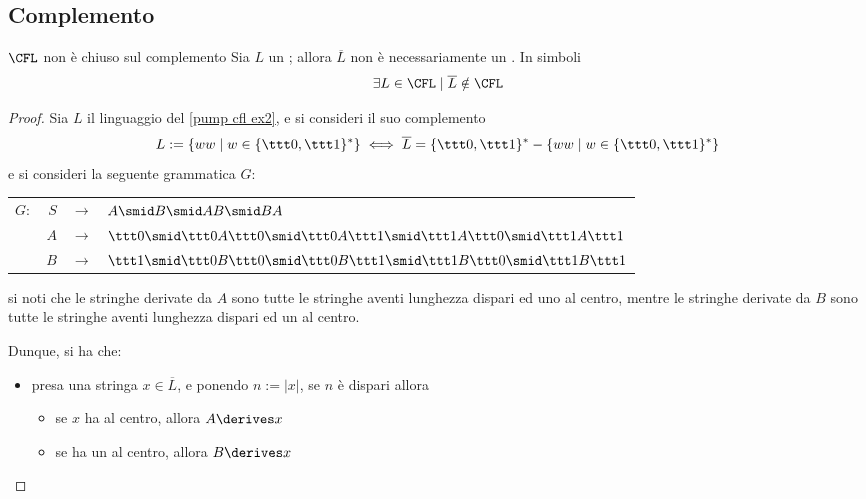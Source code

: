 \documentclass[a4paper, 12pt]{report}
\begin{document}
    \subsection{Complemento}

    \begin{framedprop}{$\mathrm{\CFL}$ non è chiuso sul complemento}
        Sia $L$ un \CFL; allora $\overline L$ non è necessariamente un \CFL. In simboli $$\exists L \in \CFL \mid \overline L \notin \CFL$$
    \end{framedprop}

    \begin{proof}
        Sia $L$ il linguaggio del \cref{pump cfl ex2}, e si consideri il suo complemento $$L := \{ww \mid w \in \{\ttt 0, \ttt 1\}^*\} \iff \overline L = \{\ttt 0, \ttt 1\}^* - \{ww \mid w \in \{\ttt 0, \ttt 1\}^*\}$$ e si consideri la seguente grammatica $G$:

        \begin{center}
            \begin{tabular}{crcl}
                $G:$ & $S$ & $\to$ & $A \smid B \smid AB \smid BA$ \\
                     & $A$ & $\to$ & $\ttt 0 \smid \ttt 0 A \ttt 0 \smid \ttt 0 A \ttt 1 \smid \ttt 1 A \ttt 0 \smid \ttt 1 A \ttt 1$ \\
                     & $B$ & $\to$ & $\ttt 1 \smid \ttt 0 B \ttt 0 \smid \ttt 0 B \ttt 1 \smid \ttt 1 B \ttt 0 \smid \ttt 1 B \ttt 1$
            \end{tabular}
        \end{center}
        
        si noti che le stringhe derivate da $A$ sono tutte le stringhe aventi lunghezza dispari ed uno  al centro, mentre le stringhe derivate da $B$ sono tutte le stringhe aventi lunghezza dispari ed un  al centro.

        Dunque, si ha che:

        \begin{itemize}
            \item presa una stringa $x \in \overline L$, e ponendo $n := |x|$, se $n$ è dispari allora
                \begin{itemize}
                    \item se $x$ ha  al centro, allora $A \derives x$
                    \item se ha un  al centro, allora $B \derives x$
                \end{itemize}
                

\end{itemize}
\end{proof}
\end{document}
